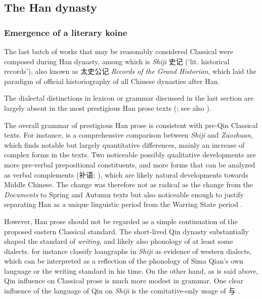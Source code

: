 \documentclass[UTF8, a4paper, oneside, scheme=plain, 12pt]{ctexrep}
\newcommand*{\citepage}[1]{p.~{#1}}
\newcommand*{\citepages}[1]{pp.~{#1}}
\newcommand{\form}[1]{\emph{#1}}
\newcommand{\work}[1]{\textit{#1}}
\newcommand{\translate}[1]{`#1'}
\begin{document}
\subsection{The Han dynasty}\label{sec:introduction.history.han}

\subsubsection{Emergence of a literary koine}\label{sec:introduction.history.han.prose}

The last batch of works that may be reasonably considered Classical were composed during Han dynasty,
among which is \work{Shiji} 史记 (\translate{lit. historical records}),
also known as 太史公记 \form{Records of the Grand Historian},
which laid the paradigm of official historiography of all Chinese dynasties after Han.

The dialectal distinctions in lexicon or grammar discussed in the last section are largely absent in the most prestigious Han prose texts (\citealt[\citepage{94}]{karlgren1936zuozhuan}; see also ).

The overall grammar of prestigious Han prose is consistent with pre-Qin Classical texts.
For instance, \citet{he2005shiji} is a comprehensive comparison between \work{Shiji} and \work{Zuozhuan},
which finds notable but largely quantitative differences, mainly an increase of complex forms in the texts.
Two noticeable possibly qualitative developments are more pre-verbal prepositional constituents,
and more forms that can be analyzed as verbal complements (补语; ),
which are likely natural developments towards Middle Chinese.
The change was therefore not as radical as the change 
from the \form{Documents} to Spring and Autumn texts
but also noticeable enough to justify separating Han as a unique linguistic period from the Warring State period 
\citep[\citepages{260-264}]{he2005shiji}.

However, Han prose should not be regarded as a simple continuation of the proposed eastern Classical standard.
The short-lived Qin dynasty substantially shaped the standard of \emph{writing}, and likely also phonology of at least some dialects.
\citet{bian2017dialect} for instance classify loangraphs in \work{Shiji} as evidence of western dialects,
which can be interpreted as a reflection of the phonology of Sima Qian's own language or the writing standard in his time.
On the other hand, as is said above, Qin influence on Classical prose is much more modest in grammar.
One clear influence of the language of Qin on \work{Shiji} is the comitative-only usage of 与 \citep{onishi1998conj}.
\end{document}
